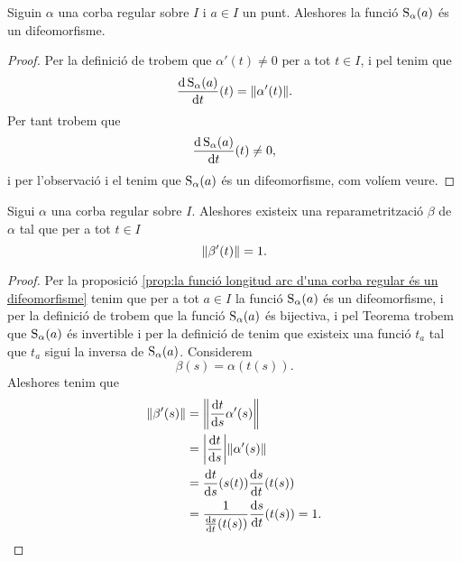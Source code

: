 \documentclass[../Apunts.tex]{subfiles}
\begin{document}
	\begin{proposition}
		\label{prop:la funció longitud arc d'una corba regular és un difeomorfisme}
		Siguin \(\alpha\) una corba regular sobre \(I\) i \(a\in I\) un punt. Aleshores la funció \(\operatorname{S}_{\alpha}(a)\) és un difeomorfisme. %
		\begin{proof}
			Per la definició de  trobem que \(\alpha'(t)\neq0\) per a tot \(t\in I\), i pel  tenim que
			\[\frac{\diff\funciolongituddarc_{\alpha}(a)}{\diff t}(t)=\norm{\alpha'(t)}.\]
			Per tant trobem que %
			\[\frac{\mathrm{d}\operatorname{S}_{\alpha}(a)}{\mathrm{d} t}(t)\neq0,\]
			i per l'observació  i el \corollari 		{} tenim que \(\operatorname{S}_{\alpha}(a)\) és un difeomorfisme, com volíem veure. %
		\end{proof}
	\end{proposition}
	\begin{proposition} %
		\label{prop:podem trobar una reparametrització amb velocitat unitaria de qualsevol corba regular}
		Sigui \(\alpha\) una corba regular sobre \(I\). Aleshores existeix una reparametrització \(\beta\) de \(\alpha\) tal que per a tot \(t\in I\)
		\[\norm{\beta'(t)}=1.\]
		\begin{proof}
			Per la proposició \ref{prop:la funció longitud arc d'una corba regular és un difeomorfisme} tenim que per a tot \(a\in I\) la funció \(\operatorname{S}_{\alpha}(a)\) és un difeomorfisme, i per la definició de  trobem que la funció \(\operatorname{S}_{\alpha}(a)\) és bijectiva, i pel Teorema  trobem que \(\operatorname{S}_{\alpha}(a)\) és invertible i per la definició de  tenim que existeix una funció \(t_{a}\) tal que \(t_{a}\) sigui la inversa de \(\operatorname{S}_{\alpha}(a)\). Considerem
			\[\beta(s)=\alpha(t(s)).\]
			Aleshores tenim que
			\begin{align*} %
				\norm{\beta'(s)}&=\norm{\frac{\diff t}{\diff s}\alpha'(s)} \\
				&=\abs{\frac{\diff t}{\diff s}}\norm{\alpha'(s)} \\
				&=\frac{\diff t}{\diff s}(s(t))\frac{\diff s}{\diff t}(t(s))\\
				&=\frac{1}{\frac{\diff s}{\diff t}(t(s))}\frac{\diff s}{\diff t}(t(s))=1. \qedhere
			\end{align*}
		\end{proof}
	\end{proposition}
\end{document}
